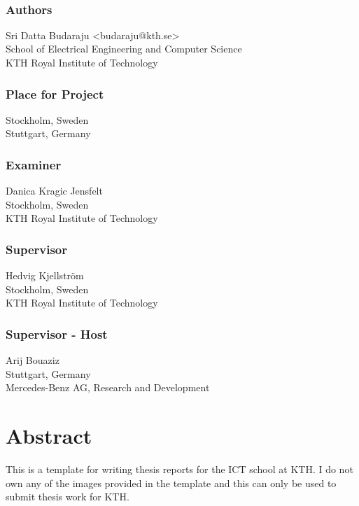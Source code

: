 \newpage
\thispagestyle{plain}
~\\
\vfill
{ 
	\subsection*{Authors}
	Sri Datta Budaraju <budaraju@kth.se>\\
    School of Electrical Engineering and Computer Science\\
	KTH Royal Institute of Technology
	
	\subsection*{Place for Project}
	Stockholm, Sweden\\
	Stuttgart, Germany

	\subsection*{Examiner}
	Danica Kragic Jensfelt\\
	Stockholm, Sweden\\
	KTH Royal Institute of Technology
	
	\subsection*{Supervisor }
	Hedvig Kjellström\\
	Stockholm, Sweden\\
	KTH Royal Institute of Technology
	
	\subsection*{Supervisor - Host}
	Arij Bouaziz\\
	Stuttgart, Germany\\
	Mercedes-Benz AG,  Research and Development
	~
}

\newpage
\thispagestyle{plain}
\chapter*{Abstract}

This is a template for writing thesis reports for the ICT school at KTH. I do not own any of the images provided in the template and this can only be used to submit thesis work for KTH.

